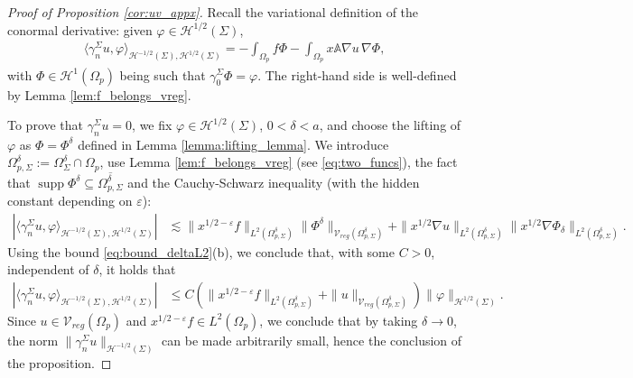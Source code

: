 \documentclass[report]{elsarticle}
\numberwithin{theorem}{section}
\renewcommand{\H}{\mathcal{H}}
\newcommand{\re}{\varepsilon}
\begin{document}
\begin{proof}[Proof of Proposition \ref{cor:uv_appx}]
Recall the variational definition of the conormal derivative: given $\varphi\in \mathcal{H}^{1/2}(\Sigma)$,
\begin{align}
	\label{eq:nderdef}
	\langle 	\gamma_{n}^{\Sigma}u, \varphi\rangle_{\mathcal{H}^{-1/2}(\Sigma), \mathcal{H}^{1/2}(\Sigma)}=-\int_{\Omega_p} f\Phi -\int_{\Omega_p}x\mathbb{A} \nabla u\, \nabla \Phi,
\end{align}
with $\Phi\in\H^1(\Omega_p)$ being such that $\gamma_0^{\Sigma}\Phi=\varphi$. The right-hand side is well-defined by Lemma \ref{lem:f_belongs_vreg}. 

To prove that $\gamma_n^{\Sigma}u=0$, we fix $\varphi\in \mathcal{H}^{1/2}(\Sigma)$, $0<\delta<a$, and choose the lifting of $\varphi$ as $\Phi=\Phi^{\delta}$ defined in Lemma \ref{lemma:lifting_lemma}. We introduce $\Omega_{p,\Sigma}^{\delta}:=\Omega_{\Sigma}^{\delta}\cap \Omega_p$, use Lemma \ref{lem:f_belongs_vreg} (see \eqref{eq:two_funcs}), the fact that $\operatorname{supp}\Phi^{\delta}\subseteq\overline{\Omega_{p,\Sigma}^{\delta}}$ and the Cauchy-Schwarz inequality (with the hidden constant depending on $\re$):
\begin{align*}
	\left|\langle 	\gamma_{n}^{\Sigma}u, \varphi\rangle_{\mathcal{H}^{-1/2}(\Sigma), \mathcal{H}^{1/2}(\Sigma)}\right|&\lesssim  \|x^{1/2-\varepsilon}f\|_{L^2(\Omega_{p,\Sigma}^{\delta})}\|\Phi^{\delta}\|_{\mathcal{V}_{reg}(\Omega_{p,\Sigma}^{\delta})}+\|x^{1/2}\nabla u\|_{L^2(\Omega_{p,\Sigma}^{\delta})}\|x^{1/2}\nabla \Phi_{\delta}\|_{L^2(\Omega_{p,\Sigma}^{\delta})}.
\end{align*}
Using the bound \eqref{eq:bound_deltaL2}(b), we  conclude that, with some $C>0$, independent of $\delta$, it holds that 
\begin{align*}
	\left|\langle 	\gamma_{n}^{\Sigma}u, \varphi\rangle_{\mathcal{H}^{-1/2}(\Sigma), \mathcal{H}^{1/2}(\Sigma)}\right|&\leq C \left(\|x^{1/2-\varepsilon}f\|_{L^2(\Omega_{p,\Sigma}^{\delta})}+\|u\|_{\mathcal{V}_{reg}(\Omega_{p,\Sigma}^{\delta})}\right)\|\varphi\|_{\mathcal{H}^{1/2}(\Sigma)}.
\end{align*}
Since $u\in \mathcal{V}_{reg}(\Omega_p)$ and  $x^{1/2-\varepsilon}f\in L^2(\Omega_p)$, we conclude that by taking $\delta\rightarrow 0$, the norm $\|\gamma_n^{\Sigma}u\|_{\mathcal{H}^{-1/2}(\Sigma)}$ can be made arbitrarily small, hence the conclusion of the proposition.
\end{proof}
\end{document}
